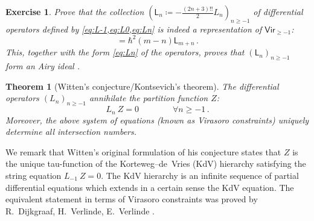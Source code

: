 \documentclass[11pt,reqno]{amsart}
\numberwithin{equation}{section}
\newcommand{\ms}[1]{\mathsf{#1}}
\newcommand{\Vir}{{\ms{Vir}_{\ge -1}}}
\theoremstyle{plain}
\newtheorem{theorem}{Theorem}[section]
\newtheorem{exercise}{Exercise}[section]
\theoremstyle{definition}
\begin{document}
\begin{exercise}
  Prove that the collection $(\ms{L}_{n} \coloneqq - \frac{(2n+3)!!}{2} L_n )_{n \ge -1}$ of differential operators defined by \cref{eq:L-1,eq:L0,eq:Ln} is indeed a representation of $\Vir$:
  \begin{equation}
    [\ms{L}_m, \ms{L}_n] = \hbar^2 (m - n) \ms{L}_{m+n} \,.
  \end{equation}
  This, together with the form \eqref{eq:Ln} of the operators, proves that $(\ms{L}_{n})_{n \ge -1}$ form an Airy ideal \cite{Bou26}.
\end{exercise}

\begin{theorem}[{Witten's conjecture/Kontsevich's theorem}]
  The differential operators $(L_{n})_{n \ge -1}$ annihilate the partition function $Z$:
  \begin{equation}\label{eq:Vir}
    L_{n}~Z = 0
    \qquad\qquad
    \forall n \ge -1 \,.
   \end{equation}
   Moreover, the above system of equations (known as \emph{Virasoro constraints}) uniquely determine all intersection numbers.
\end{theorem}

We remark that Witten's original formulation of his conjecture states that $Z$ is the unique tau-function of the Korteweg--de~Vries (KdV) hierarchy satisfying the string equation $L_{-1}~Z = 0$. The KdV hierarchy is an infinite sequence of partial differential equations which extends in a certain sense the KdV equation. The equivalent statement in terms of Virasoro constraints was proved by R.~Dijkgraaf, H.~Verlinde, E.~Verlinde \cite{DVV91}.
\end{document}
